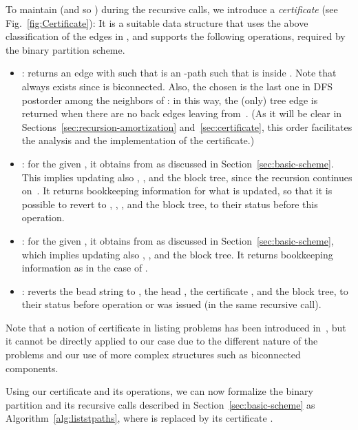 To maintain  (and so ) during the recursive calls,
we introduce a \emph{certificate}  (see Fig.~\ref{fig:Certificate}): It is a suitable data structure that uses the above
classification of the edges in , and supports the
following operations, required by the binary partition scheme.
\begin{itemize}
\item : returns an edge  with  such that  is an
	-path such that  is inside .
	Note that  always exists since  is biconnected.
	Also, the chosen  is the last one in DFS postorder among the
	neighbors of : in this way, the (only) tree edge  is
	returned when there are no back edges leaving from~.  (As
	it will be clear in Sections~\ref{sec:recursion-amortization}
	and~\ref{sec:certificate}, this order facilitates the analysis
	and the implementation of the certificate.)
\item : for the given , it obtains
	 from  as discussed in
	Section~\ref{sec:basic-scheme}. This implies updating also
	, , and the block tree, since the recursion
	continues on~. It returns bookkeeping information  for
	what is updated, so that it is possible to revert to
	, , , and the block tree, to their
	status before this operation.
\item : for the given , it obtains
	 from  as discussed in
	Section~\ref{sec:basic-scheme}, which implies updating also
	, , and the block tree. It returns bookkeeping
	information  as in the case of .
\item : reverts the bead string to ,
	the head , the certificate , and the block tree, to
	their status before operation  or  was issued (in the same recursive call).
\end{itemize}

Note that a notion of certificate in listing problems has been
introduced in~\cite{Ferreira11}, but it cannot be directly applied to
our case due to the different nature of the problems and our use of more
complex structures such as biconnected components. 

Using our certificate
and its operations, we can now formalize the binary partition and its
recursive calls  described in
Section~\ref{sec:basic-scheme} as Algorithm~\ref{alg:liststpaths},
where  is replaced by its certificate .

\begin{algorithm}[t]
	\caption{\label{alg:liststpaths} }
\begin{algorithmic}[1]
	\IF{}
		\STATE  \label{code:base}
		\STATE  \label{code:returnbase}
	\ENDIF
	\STATE  \label{code:choose}
	\IF{  \label{code:if_back}}
		\STATE   \label{code:right_update}
		\STATE  \label{code:right_branch}
		\STATE  \label{code:right_undo}
	\ENDIF
        \STATE  \label{code:left_update}
        \STATE  \label{code:left_branch}
        \STATE  \label{code:left_undo}
\end{algorithmic}
\end{algorithm}

